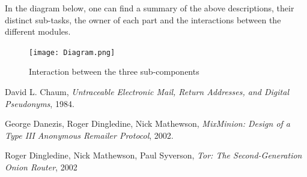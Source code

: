 \documentclass[11pt, a4paper]{article}
\begin{document}
    In the diagram below, one can find a summary of the above descriptions, their distinct sub-tasks, the owner of each part and the interactions between the different modules.

\begin{figure}[h]
  \texttt{[image: Diagram.png]}
  \caption{Interaction between the three sub-components}
  \label{fig:taskdiagram}
\end{figure}

\newpage

\begin{thebibliography}{9}

  David L. Chaum,
  \textit{Untraceable Electronic Mail, Return Addresses, and Digital Pseudonyms},
  1984.

  George Danezis, Roger Dingledine, Nick Mathewson,
  \textit{MixMinion: Design of a Type III Anonymous Remailer Protocol},
  2002.

    Roger Dingledine, Nick Mathewson, Paul Syverson,
    \textit{Tor: The Second-Generation Onion Router},
    2002

\end{thebibliography}
\end{document}
